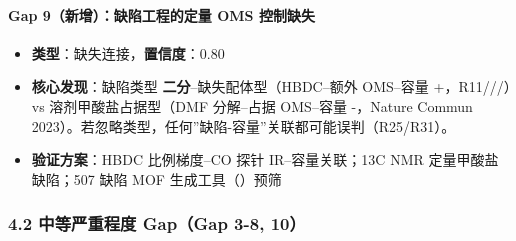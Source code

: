 \documentclass[12pt,a4paper]{ctexart}
\providecommand{\tightlist}{%
  \setlength{\itemsep}{0pt}\setlength{\parskip}{0pt}}
\begin{document}
\paragraph{Gap 9（新增）：缺陷工程的定量 OMS 控制缺失}\label{gap-9ux65b0ux589eux7f3aux9677ux5de5ux7a0bux7684ux5b9aux91cf-oms-ux63a7ux5236ux7f3aux5931}

\begin{itemize}
\tightlist
\item
  \textbf{类型}：缺失连接，\textbf{置信度}：0.80
\item
  \textbf{核心发现}：缺陷类型 \textbf{二分}--缺失配体型（HBDC--额外 OMS--容量 +，R11/\cite{p7}/\cite{p13}/\cite{p192}）vs 溶剂甲酸盐占据型（DMF 分解--占据 OMS--容量 -，Nature Commun 2023）。若忽略类型，任何''缺陷-容量''关联都可能误判（R25/R31）。
\item
  \textbf{验证方案}：HBDC 比例梯度--CO 探针 IR--容量关联；13C NMR 定量甲酸盐缺陷；507 缺陷 MOF 生成工具（\cite{r11s3_e8a9b380a8bb}）预筛
\end{itemize}

\subsubsection{4.2 中等严重程度 Gap（Gap 3-8, 10）}\label{ux4e2dux7b49ux4e25ux91cdux7a0bux5ea6-gapgap-3-8-10}
\end{document}
